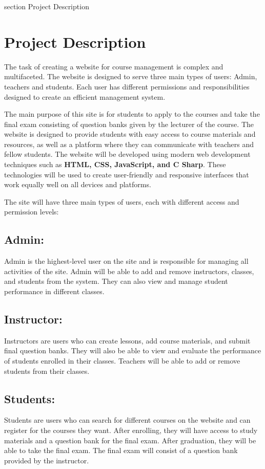 

 {section} {Project Description}
\section*{Project Description}
\label{Project Description}

The task of creating a website for course management is complex and multifaceted. The website is designed to serve three main types of users: Admin, teachers and students. Each user has different permissions and responsibilities designed to create an efficient management system.

The main purpose of this site is for students to apply to the courses and take the final exam consisting of question banks given by the lecturer of the course. The website is designed to provide students with easy access to course materials and resources, as well as a platform where they can communicate with teachers and fellow students.
The website will be developed using modern web development techniques such as \textbf{HTML, CSS, JavaScript, and C Sharp}. These technologies will be used to create user-friendly and responsive interfaces that work equally well on all devices and platforms.

The site will have three main types of users, each with different access and permission levels:

\subsection*{Admin:}
Admin is the highest-level user on the site and is responsible for managing all activities of the site. Admin will be able to add and remove instructors, classes, and students from the system. They can also view and manage student performance in different classes.
\subsection*{Instructor:}
 Instructors are users who can create lessons, add course materials, and submit final question banks. They will also be able to view and evaluate the performance of students enrolled in their classes. Teachers will be able to add or remove students from their classes.

\subsection*{Students:}
 Students are users who can search for different courses on the website and can register for the courses they want. After enrolling, they will have access to study materials and a question bank for the final exam.
After graduation, they will be able to take the final exam. The final exam will consist of a question bank provided by the instructor.

